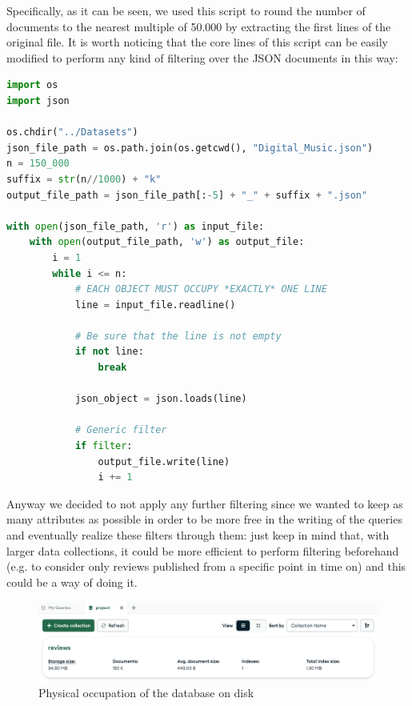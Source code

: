 Specifically, as it can be seen, we used this script to round the number of documents to the nearest multiple of 50.000 by extracting the first lines of the original file.
It is worth noticing that the core lines of this script can be easily modified to perform any kind of filtering over the JSON documents in this way:\\
\begin{lstlisting}[language=Python]
import os
import json

os.chdir("../Datasets")
json_file_path = os.path.join(os.getcwd(), "Digital_Music.json")
n = 150_000
suffix = str(n//1000) + "k"
output_file_path = json_file_path[:-5] + "_" + suffix + ".json"

with open(json_file_path, 'r') as input_file:
    with open(output_file_path, 'w') as output_file:
        i = 1
        while i <= n:
            # EACH OBJECT MUST OCCUPY *EXACTLY* ONE LINE
            line = input_file.readline()

            # Be sure that the line is not empty
            if not line:
                break
                
            json_object = json.loads(line)

            # Generic filter
            if filter:
                output_file.write(line)
                i += 1
\end{lstlisting}
Anyway we decided to not apply any further filtering since we wanted to keep as many attributes as possible in order to be more free in the writing of the queries and eventually realize these filters through them: just keep in mind that, with larger data collections, it could be more efficient to perform filtering beforehand (e.g. to consider only reviews published from a specific point in time on) and this could be a way of doing it.

\begin{figure}[H]
    \centering
    \includegraphics[scale=0.4]{Images/db_occupation.png}
    \caption{Physical occupation of the database on disk}
\end{figure}